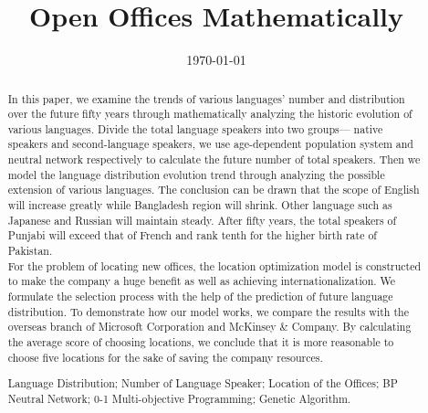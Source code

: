 \documentclass{mcmthesis}
\title{Open Offices Mathematically}
\author{}
\date{\today}
\begin{document}
\begin{abstract}
In this paper, we examine the trends of various languages' number and distribution over the future fifty years through mathematically analyzing the historic evolution of various languages. Divide the total language speakers into two groups--- native speakers and second-language speakers, we use age-dependent population system and neutral network respectively to calculate the future number of total speakers. Then we model the language distribution evolution trend through analyzing the possible extension of various languages. The conclusion can be drawn that the scope of English will increase greatly while Bangladesh region will shrink. Other language such as Japanese and Russian will maintain steady. After fifty years, the total speakers of Punjabi will exceed that of French and rank tenth for the higher birth rate of Pakistan.\\
\indent For the problem of locating new offices, the location optimization model is constructed to make the company a huge benefit as well as achieving internationalization. We formulate the selection process with the help of the prediction of future language distribution. To demonstrate how our model works, we compare the results with the overseas branch of Microsoft Corporation and McKinsey \& Company. By calculating the average score of choosing locations, we conclude that it is more reasonable to choose five locations for the sake of saving the company resources. 
\begin{keywords}
Language Distribution; Number of Language Speaker; Location of the Offices; BP Neutral Network; 0-1 Multi-objective Programming; Genetic Algorithm. 
\end{keywords}
\end{abstract}
\maketitle
\tableofcontents
\newpage
\end{document}
